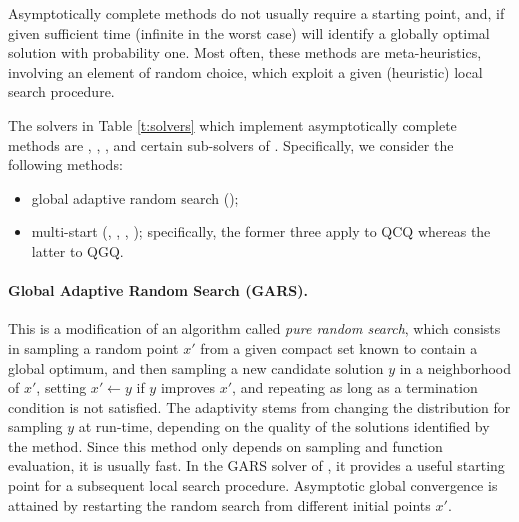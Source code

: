 Asymptotically complete methods do not usually require a starting point, and, if given sufficient time (infinite in the worst case) will identify a globally optimal solution with probability one. Most often, these methods are meta-heuristics, involving an element of random choice, which exploit a given (heuristic) local search procedure.

The solvers in Table \ref{t:solvers} which implement asymptotically complete methods are \oqnlp, \msnlp, \knitro, and certain sub-solvers of \lgo. Specifically, we consider the following methods:
%
\begin{itemize}
 \item global adaptive random search (\lgo);
 \item multi-start (\knitro, \lgo, \msnlp, \oqnlp); specifically, the former three apply to QCQ whereas the latter to QGQ.
\end{itemize}

\paragraph{Global Adaptive Random Search (GARS).}
%
This is a modification of an algorithm called \emph{pure random search}, which consists in sampling a random point $x'$ from a given compact set known to contain a global optimum, and then sampling a new candidate solution $y$ in a neighborhood of $x'$, setting $x' \leftarrow y$ if $y$ improves $x'$, and repeating as long as a termination condition is not satisfied. The adaptivity stems from changing the distribution for sampling $y$ at run-time, depending on the quality of the solutions identified by the method. Since this method only depends on sampling and function evaluation, it is usually fast. In the GARS solver of \lgo, it provides a useful starting point for a subsequent local search procedure. Asymptotic global convergence is attained by restarting the random search from different initial points $x'$. 

